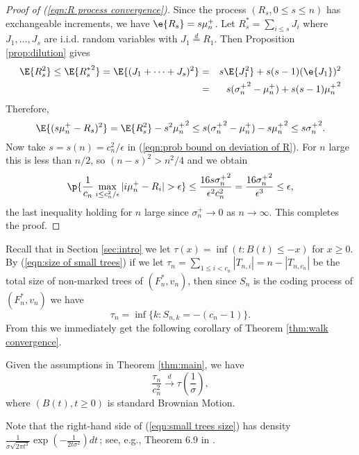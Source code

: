 \begin{proof}[Proof of (\ref{eqn:R process convergence})]
Since the process $(R_s, 0\le s\le n)$ has exchangeable increments, we have $\e{R_s}=s\mu^+_n$.
Let $R^\ast_s=\sum\limits_{i\le s} J_i$ where $J_1, \ldots, J_s$ are i.i.d. random variables with $J_1\overset{d}{=}R_1$. Then Proposition \ref{prop:dilution} gives 
\begin{eqnarray*}
\E{R^2_s}\le \E{{R^\ast_s}^2}=\E{(J_1+\cdots+J_s)^2} &=& s\E{J^2_1}+s(s-1)(\e{J_1})^2\\
&=& s({\sigma^+_n}^2-\mu^+_n)+s(s-1){\mu^+_n}^2
\end{eqnarray*}
Therefore,
\begin{equation*}
\E{(s\mu^+_n-R_s)^2}=\E{R^2_s}-s^2{\mu^+_n}^2\le s({\sigma^+_n}^2-\mu^+_n)-s{\mu^+_n}^2\le s{\sigma^+_n}^2.
\end{equation*}
Now take $s=s(n)=c^2_n/\epsilon$ in (\ref{eqn:prob bound on deviation of R}). For $n$ large this is less than $n/2$, so  $(n-s)^2>n^2/4$ and we obtain
\[\p{\frac{1}{c_n}\max\limits_{i\le c^2_n/\epsilon}|i\mu^+_n-R_i|>\epsilon}\le \frac{16s{\sigma^+_n}^2}{\epsilon^2c^2_n}=\frac{16{\sigma^+_n}^2}{\epsilon^3}\le \epsilon,\]
the last inequality holding for $n$ large since $\sigma^+_n\to 0$ as $n\to \infty$. This completes the proof.
\end{proof}

Recall that in Section \ref{sec:intro} we let $\tau(x)= \inf(t: B(t) \le -x)$ for $x \ge 0$. By (\ref{eqn:size of small trees}) if we let $\tau_n=\sum_{1 \le i < c_n} |T_{n,i}|=n-|T_{n,c_n}|$ be the total size of non-marked trees of $(F_n^*,v_n)$, then since $S_n$ is the coding process of $(F_n^*,v_n)$ we have 
\[\tau_n=\inf \{k: S_{n,k}=-(c_n-1)\}.\]
From this we immediately get the following corollary of Theorem \ref{thm:walk convergence}.

\begin{cor}\label{cor:size of forests of small trees}
Given the assumptions in Theorem \ref{thm:main}, we have
\begin{equation}\label{eqn:small trees size}
\frac{\tau_n}{c^2_n}\overset{d}{\to}\tau(\frac{1}{\sigma}),
\end{equation}
where $(B(t), t\ge 0)$ is standard Brownian Motion.
\end{cor}


 Note that the right-hand side of (\ref{eqn:small trees size}) has density 
$\frac{1}{\sigma\sqrt{2\pi t^3}}\exp\left(-\frac{1}{2t\sigma^2}\right)dt$\,;
see, e.g., Theorem 6.9 in \cite{SchillingPartzsch2012}.


